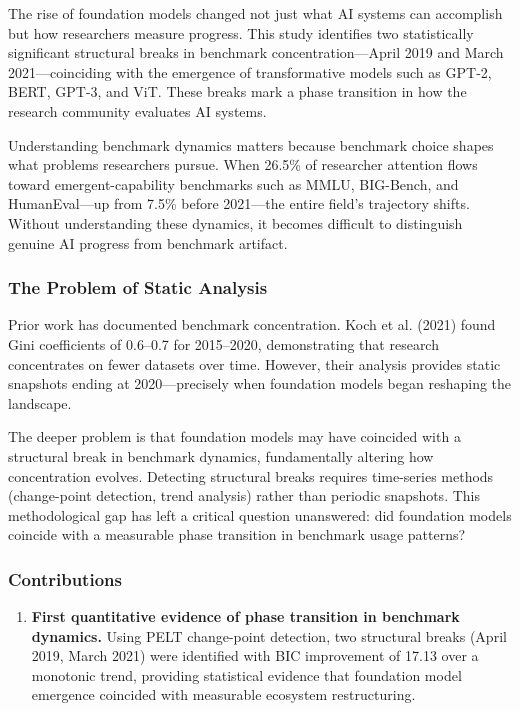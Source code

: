 
The rise of foundation models changed not just what AI systems can accomplish but how researchers measure progress. This study identifies two statistically significant structural breaks in benchmark concentration---April 2019 and March 2021---coinciding with the emergence of transformative models such as GPT-2, BERT, GPT-3, and ViT. These breaks mark a phase transition in how the research community evaluates AI systems.

Understanding benchmark dynamics matters because benchmark choice shapes what problems researchers pursue. When 26.5\% of researcher attention flows toward emergent-capability benchmarks such as MMLU, BIG-Bench, and HumanEval---up from 7.5\% before 2021---the entire field's trajectory shifts. Without understanding these dynamics, it becomes difficult to distinguish genuine AI progress from benchmark artifact.

\subsubsection{The Problem of Static Analysis}

Prior work has documented benchmark concentration. Koch et al. (2021) found Gini coefficients of 0.6--0.7 for 2015--2020, demonstrating that research concentrates on fewer datasets over time. However, their analysis provides static snapshots ending at 2020---precisely when foundation models began reshaping the landscape.

The deeper problem is that foundation models may have coincided with a structural break in benchmark dynamics, fundamentally altering how concentration evolves. Detecting structural breaks requires time-series methods (change-point detection, trend analysis) rather than periodic snapshots. This methodological gap has left a critical question unanswered: did foundation models coincide with a measurable phase transition in benchmark usage patterns?

\subsubsection{Contributions}

\begin{enumerate}
\item \textbf{First quantitative evidence of phase transition in benchmark dynamics.} Using PELT change-point detection, two structural breaks (April 2019, March 2021) were identified with BIC improvement of 17.13 over a monotonic trend, providing statistical evidence that foundation model emergence coincided with measurable ecosystem restructuring.
\end{enumerate}

